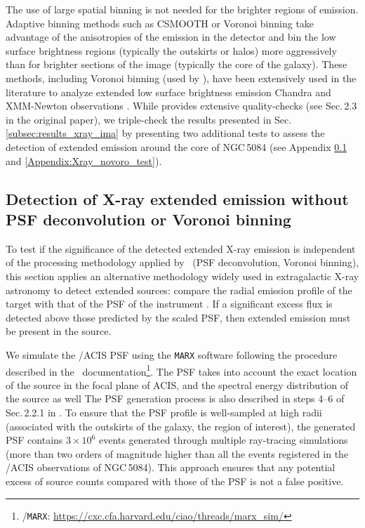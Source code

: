 \documentclass[modern]{aastex631}
\begin{document}
The use of large spatial binning is not needed for the brighter regions of emission. Adaptive binning methods such as CSMOOTH \citep{ebeling+2006mnras368_65} or Voronoi binning \citep{cappellari+2003mnras342_345, diehl+2006mnras368_497} take advantage of the anisotropies of the emission in the detector and bin the low surface brightness regions (typically the outskirts or halos) more aggressively than for brighter sections of the image (typically the core of the galaxy). These methods, including Voronoi binning (used by \SAUNAS), have been extensively used in the literature to analyze extended low surface brightness emission Chandra and XMM-Newton observations \citep[see ][and references therein]{ebeling+2007apj661_33,gonzalezmartin+2009aap506_1107,broos+2010apj714_1582, ebeling+2010mnras407_83, xue+2011apj195_10, hodgeskluck+2012apj746_167, wang+2024apj962_188}. While \citet[][\SAUNAS\, I]{borlaff+2024apj967_169} provides extensive quality-checks (see Sec.\,2.3 in the original paper), we triple-check the results presented in Sec.\,\ref{subsec:results_xray_ima} by presenting two additional tests to assess the detection of extended emission around the core of NGC\,5084 (see Appendix \ref{Appendix:Xray_noPSFdeco_test} and \ref{Appendix:Xray_novoro_test}).


\subsection{Detection of X-ray extended emission without PSF deconvolution or Voronoi binning}
\label{Appendix:Xray_noPSFdeco_test}

To test if the significance of the detected extended X-ray emission is independent of the processing methodology applied by \SAUNAS\ (PSF deconvolution, Voronoi binning), this section applies an alternative methodology widely used in extragalactic X-ray astronomy to detect extended sources: compare the radial emission profile of the target with that of the PSF of the instrument \citep{fabbiano+2017apj842_4,fabbiano+2018apj855_131, jones+2020apj891_133,ma+2020apj900_164,ma+2023apj948_61}. If a significant excess flux is detected above those predicted by the scaled PSF, then extended emission must be present in the source.


We simulate the \Chandra/ACIS PSF using the \texttt{MARX} software following the procedure described in the \ciao\ documentation\footnote{\ciao/\texttt{MARX}: \url{https://cxc.cfa.harvard.edu/ciao/threads/marx_sim/}}. The PSF takes into account the exact location of the source in the focal plane of ACIS, and the spectral energy distribution of the source as well The PSF generation process is also described in steps 4--6 of Sec.\,2.2.1 in \citet{borlaff+2024apj967_169}. To ensure that the PSF profile is well-sampled at high radii (associated with the outskirts of the galaxy, the region of interest), the generated PSF contains $3\times10^6$ events generated through multiple ray-tracing simulations (more than two orders of magnitude higher than all the events registered in the \Chandra/ACIS observations of NGC\,5084). This approach ensures that any potential excess of source counts compared with those of the PSF is not a false positive.
\end{document}
